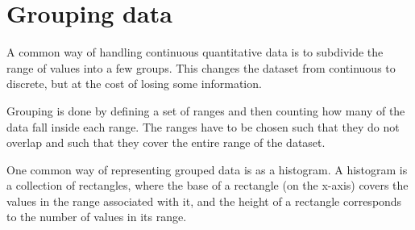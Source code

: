 \documentclass[a4paper,11pt]{report}
\begin{document}
\section{Grouping data}
\label{sec:statistics_grouping_data}
A common way of handling continuous quantitative data is to subdivide
the range of values into a few groups. This changes the dataset from
continuous to discrete, but at the cost of losing some information.

Grouping is done by defining a set of ranges and then counting how
many of the data fall inside each range. The ranges have to be chosen
such that they do not overlap and such that they cover the entire
range of the dataset.

One common way of representing grouped data is as a histogram. A
histogram is a collection of rectangles, where the base of a
rectangle (on the x-axis) covers the values in the range associated
with it, and the height of a rectangle corresponds to the number of
values in its range.
\end{document}
